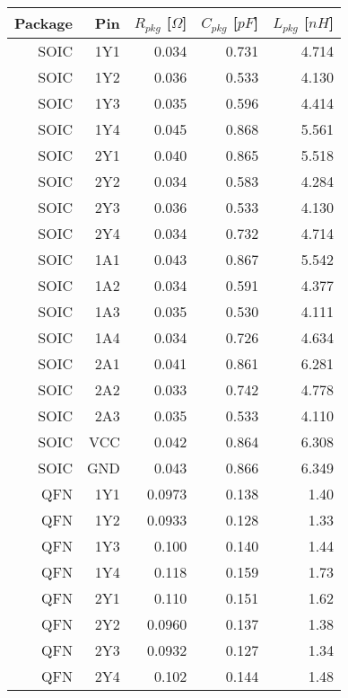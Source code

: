 \documentclass[../main.tex]{subfiles}
\begin{document}
\begin{table}[h]
    \centering
    \begin{tabular}{r|r r r r}
        \toprule[1pt]
        \textbf{Package} & \textbf{Pin} & $R_{pkg}$ [$\si{\Omega}$] & $C_{pkg}$ [$\si{pF}$] & $L_{pkg}$ [$\si{nH}$] \\
        \midrule
        SOIC  & 1Y1  & 0.034 & 0.731 & 4.714 \\
        SOIC  & 1Y2  & 0.036 & 0.533 & 4.130 \\
        SOIC  & 1Y3  & 0.035 & 0.596 & 4.414 \\
        SOIC  & 1Y4  & 0.045 & 0.868 & 5.561 \\
        SOIC  & 2Y1  & 0.040 & 0.865 & 5.518 \\
        SOIC  & 2Y2  & 0.034 & 0.583 & 4.284 \\
        SOIC  & 2Y3  & 0.036 & 0.533 & 4.130 \\
        SOIC  & 2Y4  & 0.034 & 0.732 & 4.714 \\
        \midrule
        SOIC  & 1A1  & 0.043 & 0.867 & 5.542 \\
        SOIC  & 1A2  & 0.034 & 0.591 & 4.377 \\
        SOIC  & 1A3  & 0.035 & 0.530 & 4.111 \\
        SOIC  & 1A4  & 0.034 & 0.726 & 4.634 \\
        SOIC  & 2A1  & 0.041 & 0.861 & 6.281 \\
        SOIC  & 2A2  & 0.033 & 0.742 & 4.778 \\
        SOIC  & 2A3  & 0.035 & 0.533 & 4.110 \\
        \midrule
        SOIC  & VCC  & 0.042 & 0.864 & 6.308 \\
        SOIC  & GND  & 0.043 & 0.866 & 6.349 \\
        \midrule
        QFN  & 1Y1  & 0.0973 & 0.138 & 1.40 \\
        QFN  & 1Y2  & 0.0933 & 0.128 & 1.33 \\
        QFN  & 1Y3  & 0.100  & 0.140 & 1.44 \\
        QFN  & 1Y4  & 0.118  & 0.159 & 1.73 \\
        QFN  & 2Y1  & 0.110  & 0.151 & 1.62 \\
        QFN  & 2Y2  & 0.0960 & 0.137 & 1.38 \\
        QFN  & 2Y3  & 0.0932 & 0.127 & 1.34 \\
        QFN  & 2Y4  & 0.102  & 0.144 & 1.48 \\
        \midrule

\end{tabular}
\end{table}
\end{document}
